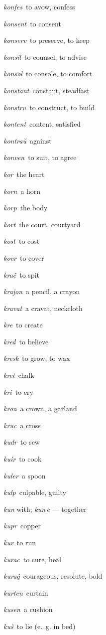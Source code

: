 \begin{landscape}
\begin{multicols}{5}
\begin{outdent}{1em}
\emph{konfes\,} to avow, confess

\emph{konsent\,} to consent

\emph{konserv\,} to preserve, to keep

\emph{konsil\,} to counsel, to advise

\emph{konsol\,} to console, to comfort

\emph{konstant\,} constant, steadfast

\emph{konstru\,} to construct, to build

\emph{kontent\,} content, satisfied

\emph{kontraŭ\,} against

\emph{konven\,} to suit, to agree

\emph{kor\,} the heart

\emph{korn\,} a horn

\emph{korp\,} the body

\emph{kort\,} the court, courtyard

\emph{kost\,} to cost

\emph{kovr\,} to cover

\emph{kraĉ\,} to spit

\emph{krajon\,} a pencil, a crayon

\emph{kravat\,} a cravat, neckcloth

\emph{kre\,} to create

\emph{kred\,} to believe

\emph{kresk\,} to grow, to wax

\emph{kret\,} chalk

\emph{kri\,} to cry

\emph{kron\,} a crown, a garland

\emph{kruc\,} a cross

\emph{kudr\,} to sew

\emph{kuir\,} to cook

\emph{kuler\,} a spoon

\emph{kulp\,} culpable, guilty

\emph{kun} with; \emph{kun\,e} — together

\emph{kupr\,} copper

\emph{kur\,} to run

\emph{kurac\,} to cure, heal

\emph{kuraĝ\,} courageous, resolute, bold

\emph{kurten\,} curtain

\emph{kusen\,} a cushion

\emph{kuŝ\,} to lie (e.~g. in bed)


\end{outdent}
\end{multicols}
\end{landscape}
